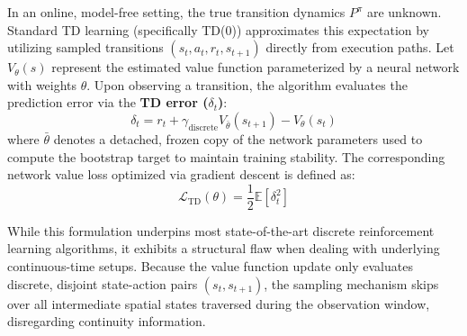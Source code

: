 \documentclass{article}
\begin{document}
In an online, model-free setting, the true transition dynamics $P^\pi$ are unknown. Standard TD learning (specifically TD(0)) approximates this expectation by utilizing sampled transitions $(s_t, a_t, r_t, s_{t+1})$ directly from execution paths. Let $V_\theta(s)$ represent the estimated value function parameterized by a neural network with weights $\theta$. Upon observing a transition, the algorithm evaluates the prediction error via the \textbf{TD error ($\delta_t$)}:
\begin{equation}
    \delta_t = r_t + \gamma_{\text{discrete}} V_{\bar{\theta}}(s_{t+1}) - V_{\theta}(s_t)
\end{equation}
where $\bar{\theta}$ denotes a detached, frozen copy of the network parameters used to compute the bootstrap target to maintain training stability. The corresponding network value loss optimized via gradient descent is defined as:
\begin{equation}
    \mathcal{L}_{\text{TD}}(\theta) = \frac{1}{2} \mathbb{E} \left[ \delta_t^2 \right]
\end{equation}

While this formulation underpins most state-of-the-art discrete reinforcement learning algorithms, it exhibits a structural flaw when dealing with underlying continuous-time setups. Because the value function update only evaluates discrete, disjoint state-action pairs $(s_t, s_{t+1})$, the sampling mechanism skips over all intermediate spatial states traversed during the observation window, disregarding continuity information.
\end{document}
